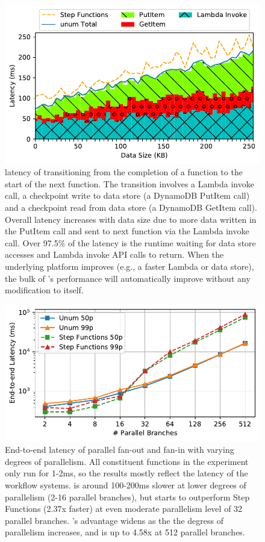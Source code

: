 \begin{figure}[t!]
  \centering
  \includegraphics[width=\columnwidth]{figures/TotalAdditionalLatencyNBreakdown.pdf}
  \caption{\name{} latency of transitioning from the completion of a function
    to the start of the next function. The transition involves a Lambda
    invoke call, a checkpoint write to data store (a DynamoDB PutItem call)
    and a checkpoint read from data store (a DynamoDB GetItem call). Overall
    latency increases with data size due to more data written in the PutItem
    call and sent to next function via the Lambda invoke call. Over 97.5\% of
    the latency is the
    \name{} runtime waiting for data store accesses and Lambda invoke API
    calls to return. When the underlying platform improves (e.g., a faster
    Lambda or data store), the bulk of \name{}'s performance will
    automatically improve without any modification to \name{} itself.}
  \label{fig:single-transition-latency-breakdown}
\end{figure}

\begin{figure}[t!]
  \centering
  \includegraphics[width=\columnwidth]{figures/MapMicroLatency.pdf}
  \caption{End-to-end latency of parallel fan-out and fan-in with varying
    degrees of parallelism. All constituent functions in the experiment only
    run for 1-2ms, so the results mostly reflect the latency of the workflow
    systems. \name{} is around 100-200ms slower at lower degrees of
    parallelism (2-16 parallel branches), but starts to outperform Step
    Functions (2.37x faster) at even moderate parallelism level of 32 parallel
    branches. \name{}'s advantage widens as the the degress of parallelism
    increases, and is up to 4.58x at 512 parallel branches.}
  \label{fig:mapmicrolatency}
\end{figure}

